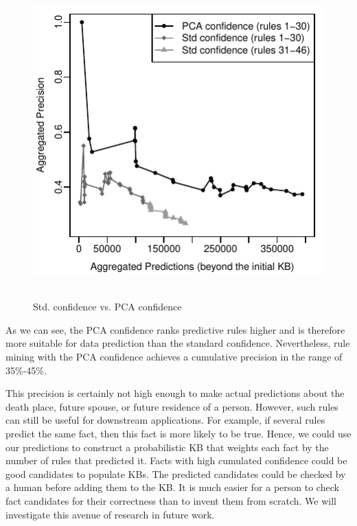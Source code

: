 \begin{figure}
\includegraphics{figures/std_vs_pca}\ %
\caption{Std. confidence vs. PCA confidence}
\label{finalshow}
\end{figure}

As we can see, the PCA confidence ranks predictive rules higher and is therefore more suitable for data prediction than the standard confidence.
Nevertheless, rule mining with the PCA confidence achieves a cumulative precision in the range of 35\%-45\%.

This precision is certainly not high enough to make actual predictions about the death place, future spouse, or future residence of a person. However, such rules can still be useful for downstream applications. For example, if several rules predict the same fact, then this fact is more likely to be true. Hence, we could use our predictions to construct a probabilistic KB that weights each fact by the number of rules that predicted it. Facts with high cumulated confidence could be good candidates to populate KBs. 
The predicted candidates could be checked by a human before adding them to the KB. It is much easier for a person to check fact candidates for their correctness than to invent them from scratch. We will investigate this avenue of research in future work.

